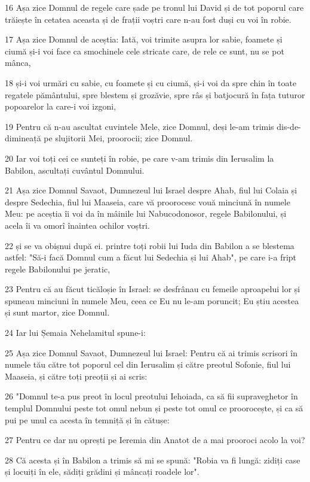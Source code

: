 \par 16 Așa zice Domnul de regele care șade pe tronul lui David și de tot poporul care trăiește în cetatea aceasta și de frații voștri care n-au fost duși cu voi în robie.
\par 17 Așa zice Domnul de aceștia: Iată, voi trimite asupra lor sabie, foamete și ciumă și-i voi face ca smochinele cele stricate care, de rele ce sunt, nu se pot mânca,
\par 18 și-i voi urmări cu sabie, cu foamete și cu ciumă, și-i voi da spre chin în toate regatele pământului, spre blestem și grozăvie, spre râs și batjocură în fața tuturor popoarelor la care-i voi izgoni,
\par 19 Pentru că n-au ascultat cuvintele Mele, zice Domnul, deși le-am trimis dis-de-dimineață pe slujitorii Mei, proorocii; zice Domnul.
\par 20 Iar voi toți cei ce sunteți în robie, pe care v-am trimis din Ierusalim la Babilon, ascultați cuvântul Domnului.
\par 21 Așa zice Domnul Savaot, Dumnezeul lui Israel despre Ahab, fiul lui Colaia și despre Sedechia, fiul lui Maaseia, care vă proorocesc vouă minciună în numele Meu: pe aceștia îi voi da în mâinile lui Nabucodonosor, regele Babilonului, și acela îi va omorî înaintea ochilor voștri.
\par 22 și se va obișnui după ei. printre toți robii lui Iuda din Babilon a se blestema astfel: "Să-i facă Domnul cum a făcut lui Sedechia și lui Ahab", pe care i-a fript regele Babilonului pe jeratic,
\par 23 Pentru că au făcut ticăloșie în Israel: se desfrânau cu femeile aproapelui lor și spuneau minciuni în numele Meu, ceea ce Eu nu le-am poruncit; Eu știu acestea și sunt martor, zice Domnul.
\par 24 Iar lui Șemaia Nehelamitul spune-i:
\par 25 Așa zice Domnul Savaot, Dumnezeul lui Israel: Pentru că ai trimis scrisori în numele tău către tot poporul cel din Ierusalim și către preotul Sofonie, fiul lui Maaseia, și către toți preoții și ai scris:
\par 26 "Domnul te-a pus preot în locul preotului Iehoiada, ca să fii supraveghetor în templul Domnului peste tot omul nebun și peste tot omul ce proorocește, și ca să pui pe unul ca acesta în temniță și în cătușe:
\par 27 Pentru ce dar nu oprești pe Ieremia din Anatot de a mai prooroci acolo la voi?
\par 28 Că acesta și în Babilon a trimis să mi se spună: "Robia va fi lungă: zidiți case și locuiți în ele, sădiți grădini și mâncați roadele lor".
